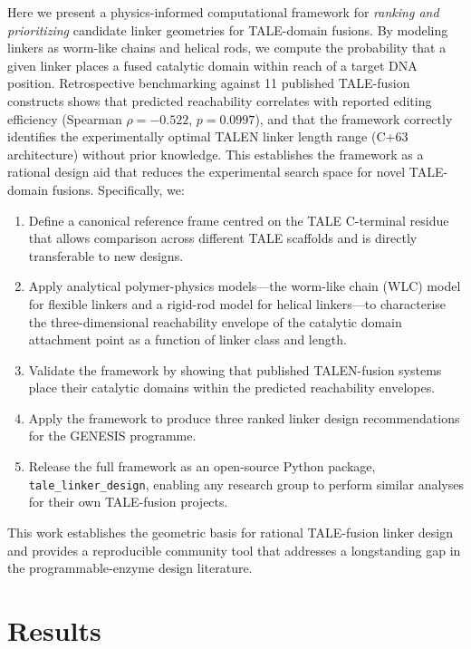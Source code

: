 \documentclass[11pt,a4paper]{article}
\newcommand{\pkg}{\texttt{tale\_linker\_design}}
\begin{document}
Here we present a physics-informed computational framework for \textit{ranking and prioritizing}
candidate linker geometries for TALE-domain fusions. By modeling linkers as worm-like chains and
helical rods, we compute the probability that a given linker places a fused catalytic domain within
reach of a target DNA position. Retrospective benchmarking against 11 published TALE-fusion
constructs shows that predicted reachability correlates with reported editing
efficiency (Spearman $\rho = -0.522$, $p = 0.0997$), and that the framework correctly
identifies the experimentally optimal TALEN linker length range (C+63 architecture) without
prior knowledge. This establishes the framework as a rational design aid that reduces the
experimental search space for novel TALE-domain fusions. Specifically, we:
\begin{enumerate}
  \item Define a canonical reference frame centred on the TALE C-terminal residue
    that allows comparison across different TALE scaffolds and is directly transferable
    to new designs.
  \item Apply analytical polymer-physics models---the worm-like chain (WLC) model
    for flexible linkers and a rigid-rod model for helical linkers---to characterise
    the three-dimensional reachability envelope of the catalytic domain attachment
    point as a function of linker class and length.
  \item Validate the framework by showing that published TALEN-fusion systems place
    their catalytic domains within the predicted reachability envelopes.
  \item Apply the framework to produce three ranked linker design recommendations
    for the GENESIS programme.
  \item Release the full framework as an open-source Python package, \pkg{}, enabling
    any research group to perform similar analyses for their own TALE-fusion projects.
\end{enumerate}

This work establishes the geometric basis for rational TALE-fusion linker design and
provides a reproducible community tool that addresses a longstanding gap in the
programmable-enzyme design literature.

\section{Results}
\label{sec:results}
\end{document}
